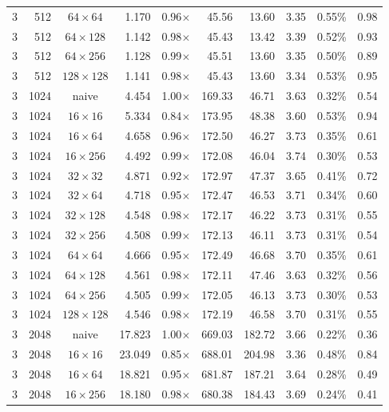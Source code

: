 \documentclass[11pt,a4paper]{article}
\begin{document}
{\begin{longtable}{rrcrrrrrrr}
3 & 512 & $64\times 64$ & 1.170 & 0.96$\times$ & 45.56 & 13.60 & 3.35 & 0.55\% & 0.98 \\
3 & 512 & $64\times 128$ & 1.142 & 0.98$\times$ & 45.43 & 13.42 & 3.39 & 0.52\% & 0.93 \\
3 & 512 & $64\times 256$ & 1.128 & 0.99$\times$ & 45.51 & 13.60 & 3.35 & 0.50\% & 0.89 \\
3 & 512 & $128\times 128$ & 1.141 & 0.98$\times$ & 45.43 & 13.60 & 3.34 & 0.53\% & 0.95 \\
\midrule
3 & 1024 & naive & 4.454 & 1.00$\times$ & 169.33 & 46.71 & 3.63 & 0.32\% & 0.54 \\
3 & 1024 & $16\times 16$ & 5.334 & 0.84$\times$ & 173.95 & 48.38 & 3.60 & 0.53\% & 0.94 \\
3 & 1024 & $16\times 64$ & 4.658 & 0.96$\times$ & 172.50 & 46.27 & 3.73 & 0.35\% & 0.61 \\
3 & 1024 & $16\times 256$ & 4.492 & 0.99$\times$ & 172.08 & 46.04 & 3.74 & 0.30\% & 0.53 \\
3 & 1024 & $32\times 32$ & 4.871 & 0.92$\times$ & 172.97 & 47.37 & 3.65 & 0.41\% & 0.72 \\
3 & 1024 & $32\times 64$ & 4.718 & 0.95$\times$ & 172.47 & 46.53 & 3.71 & 0.34\% & 0.60 \\
3 & 1024 & $32\times 128$ & 4.548 & 0.98$\times$ & 172.17 & 46.22 & 3.73 & 0.31\% & 0.55 \\
3 & 1024 & $32\times 256$ & 4.508 & 0.99$\times$ & 172.13 & 46.11 & 3.73 & 0.31\% & 0.54 \\
3 & 1024 & $64\times 64$ & 4.666 & 0.95$\times$ & 172.49 & 46.68 & 3.70 & 0.35\% & 0.61 \\
3 & 1024 & $64\times 128$ & 4.561 & 0.98$\times$ & 172.11 & 47.46 & 3.63 & 0.32\% & 0.56 \\
3 & 1024 & $64\times 256$ & 4.505 & 0.99$\times$ & 172.05 & 46.13 & 3.73 & 0.30\% & 0.53 \\
3 & 1024 & $128\times 128$ & 4.546 & 0.98$\times$ & 172.19 & 46.58 & 3.70 & 0.31\% & 0.55 \\
\midrule
3 & 2048 & naive & 17.823 & 1.00$\times$ & 669.03 & 182.72 & 3.66 & 0.22\% & 0.36 \\
3 & 2048 & $16\times 16$ & 23.049 & 0.85$\times$ & 688.01 & 204.98 & 3.36 & 0.48\% & 0.84 \\
3 & 2048 & $16\times 64$ & 18.821 & 0.95$\times$ & 681.87 & 187.21 & 3.64 & 0.28\% & 0.49 \\
3 & 2048 & $16\times 256$ & 18.180 & 0.98$\times$ & 680.38 & 184.43 & 3.69 & 0.24\% & 0.41 \\

\end{longtable}}
\end{document}
